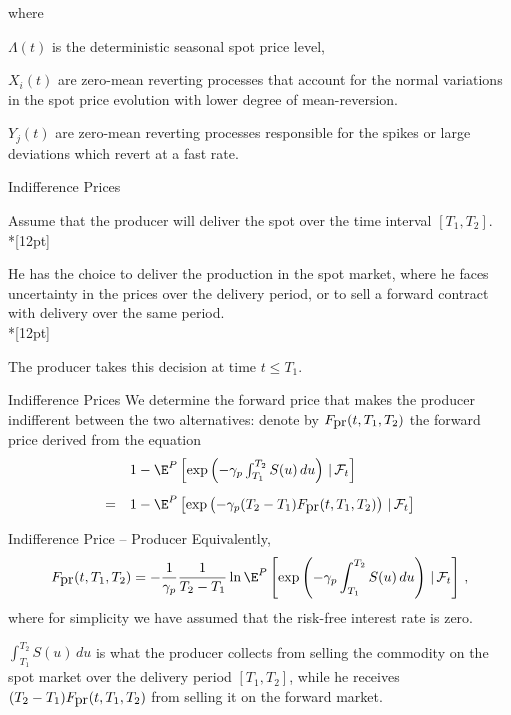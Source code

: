 	
where






	$\Lambda(t)$ is the deterministic seasonal spot price level,


	$X_i(t)$ are zero-mean reverting processes that account for the normal
variations in the spot price evolution with lower degree of
mean-reversion.


	$Y_j(t)$ are
zero-mean reverting processes responsible for the spikes or large
deviations which revert at a fast rate.









{Indifference Prices}

Assume that the producer will deliver the spot over the time
interval $[T_1,T_2]$.\\*[12pt]

He has the choice to deliver the production in
the spot market, where he faces uncertainty in the prices over the
delivery period, or to sell a forward contract with delivery over
the same period.\\*[12pt]

The producer takes this decision at time $t\leq
T_1$.

{Indifference Prices}
We determine the forward price that makes the producer indifferent
between the two alternatives: denote by $F_{\hbox{pr}}(t,T_1,T_2)$
the forward price derived from the equation
$$
\begin{array}{ll}

& 1-\E^P\left[\exp\left(-\gamma_p\int_{T_1}^{T_2}S(u)\,du\right)\,|\,
\mathcal{F}_t\right]\\*[12pt]
= & 1-\E^P\left[\exp\left(-\gamma_p(T_2-T_1)F_{\hbox{pr}}(t,T_1,T_2)\right)\,|\,
\mathcal{F}_t\right]
\end{array}
$$

{Indifference Price -- Producer}
Equivalently,
\begin{equation}
\label{def-producer}
F_{\hbox{pr}}(t,T_1,T_2)=-\frac1{\gamma_p}\frac1{T_2-T_1}\ln\E^P
\left[\exp\left(-\gamma_p\int_{T_1}^{T_2}S(u)\,du\right)\,|\,
\mathcal{F}_t\right]\,,
\end{equation}
where for simplicity we have assumed that the risk-free interest
rate is zero.

$\int_{T_1}^{T_2}S(u)\,du$ is what the
producer collects from selling the commodity on the spot market
over the delivery period $[T_1,T_2]$, while he receives
$(T_2-T_1)F_{\hbox{pr}}(t,T_1,T_2)$ from selling it on the forward
market.

